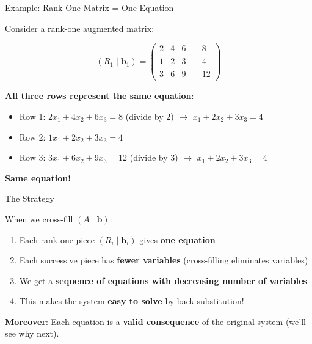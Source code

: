 \documentclass[10pt]{beamer}
\theoremstyle{definition}
\newcommand{\x}[1]{\alert{\textbf{#1}}}
\begin{document}
\begin{frame}{Example: Rank-One Matrix = One Equation}

Consider a rank-one augmented matrix:

$$(R_1 \mid \mathbf{b}_1) = \begin{pmatrix}
2 & 4 & 6 & | & 8 \\
1 & 2 & 3 & | & 4 \\
3 & 6 & 9 & | & 12
\end{pmatrix}$$

\vspace{0.5em}

\x{All three rows represent the same equation}:
\begin{itemize}
\item Row 1: $2x_1 + 4x_2 + 6x_3 = 8$ (divide by 2) $\to$ $x_1 + 2x_2 + 3x_3 = 4$
\item Row 2: $1x_1 + 2x_2 + 3x_3 = 4$
\item Row 3: $3x_1 + 6x_2 + 9x_3 = 12$ (divide by 3) $\to$ $x_1 + 2x_2 + 3x_3 = 4$
\end{itemize}

\vspace{0.5em}

\x{Same equation!}

\end{frame}

\begin{frame}{The Strategy}

When we cross-fill $(A \mid \mathbf{b})$:

\begin{enumerate}
\item Each rank-one piece $(R_i \mid \mathbf{b}_i)$ gives \x{one equation}
\item Each successive piece has \x{fewer variables} (cross-filling eliminates variables)
\item We get a \x{sequence of equations with decreasing number of variables}
\item This makes the system \x{easy to solve} by back-substitution!
\end{enumerate}

\vspace{1em}

\x{Moreover}: Each equation is a \textbf{valid consequence} of the original system (we'll see why next).

\end{frame}
\end{document}
